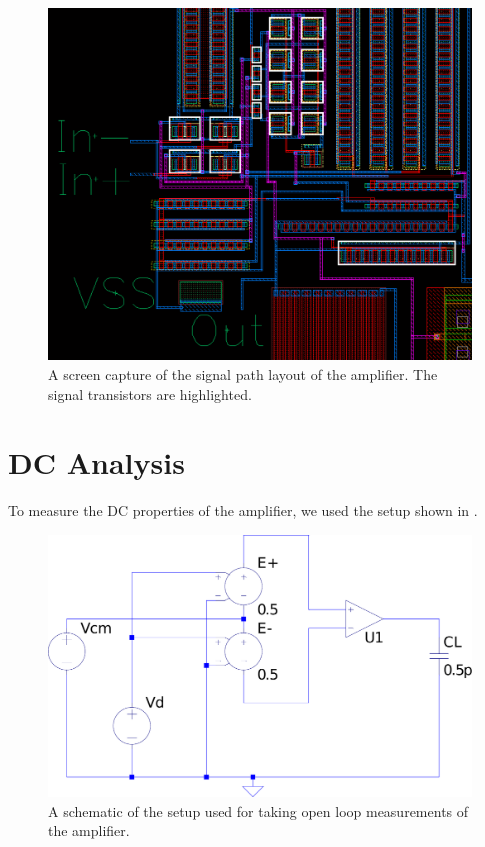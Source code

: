 \documentclass[journal,hidelinks]{IEEEtran}
\begin{document}
\begin{figure}[!htb]
  \centering
  \includegraphics[width=\columnwidth]{images/signal-tx.png}
  \caption{A screen capture of the signal path layout of the amplifier. The signal transistors are highlighted.}
  \label{fig:signal-tx}
\end{figure}

\section{DC Analysis}

To measure the DC properties of the amplifier, we used the setup shown in .

\begin{figure}[!htb]
  \centering
  \includegraphics[width=\columnwidth]{schematics/open-loop-setup.pdf}
  \caption{A schematic of the setup used for taking open loop measurements of the amplifier.}
  \label{fig:open-loop-setup}
\end{figure}
\end{document}
